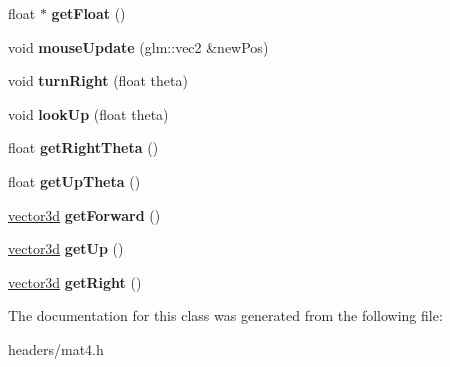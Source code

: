 \begin{DoxyCompactItemize}
\item 
\hypertarget{classmat4_ac88e7a6d5b9287a6d8e0d28912947e1e}{float $\ast$ {\bfseries get\+Float} ()}\label{classmat4_ac88e7a6d5b9287a6d8e0d28912947e1e}

\item 
\hypertarget{classmat4_a83dc13ed8d81a9cdb2a68631f74e662f}{void {\bfseries mouse\+Update} (glm\+::vec2 \&new\+Pos)}\label{classmat4_a83dc13ed8d81a9cdb2a68631f74e662f}

\item 
\hypertarget{classmat4_a9715df14b1829fdbace25ca9182d731b}{void {\bfseries turn\+Right} (float theta)}\label{classmat4_a9715df14b1829fdbace25ca9182d731b}

\item 
\hypertarget{classmat4_a8c90e6d3ddf2e96bbcdf8f2442edc0f4}{void {\bfseries look\+Up} (float theta)}\label{classmat4_a8c90e6d3ddf2e96bbcdf8f2442edc0f4}

\item 
\hypertarget{classmat4_a2cdcbba78479ea2abbb46bf54f6f9973}{float {\bfseries get\+Right\+Theta} ()}\label{classmat4_a2cdcbba78479ea2abbb46bf54f6f9973}

\item 
\hypertarget{classmat4_a80f34f731497edeef98759fd2dfa5575}{float {\bfseries get\+Up\+Theta} ()}\label{classmat4_a80f34f731497edeef98759fd2dfa5575}

\item 
\hypertarget{classmat4_a8e18d7cf51e42962c0f70b1a84e53d21}{\hyperlink{classvector3d}{vector3d} {\bfseries get\+Forward} ()}\label{classmat4_a8e18d7cf51e42962c0f70b1a84e53d21}

\item 
\hypertarget{classmat4_a28833a5c8ee50806fb56f0cdb3e650c7}{\hyperlink{classvector3d}{vector3d} {\bfseries get\+Up} ()}\label{classmat4_a28833a5c8ee50806fb56f0cdb3e650c7}

\item 
\hypertarget{classmat4_a538c1e723fe19dc9c7d569773eb959d9}{\hyperlink{classvector3d}{vector3d} {\bfseries get\+Right} ()}\label{classmat4_a538c1e723fe19dc9c7d569773eb959d9}

\end{DoxyCompactItemize}


The documentation for this class was generated from the following file\+:\begin{DoxyCompactItemize}
\item 
headers/mat4.\+h\end{DoxyCompactItemize}
